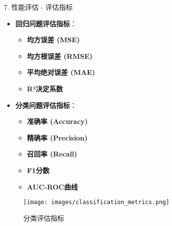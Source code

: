 \documentclass[
  ignorenonframetext,
  aspectratio=169,
  chinese-hans,
]{beamer}
\providecommand{\tightlist}{%
  \setlength{\itemsep}{0pt}\setlength{\parskip}{0pt}}\usepackage{longtable,booktabs,array}
\begin{document}
\begin{frame}{7. 性能评估 - 评估指标}
\label{ux6027ux80fdux8bc4ux4f30---ux8bc4ux4f30ux6307ux6807}
\begin{itemize}
\tightlist
\item
  \textbf{回归问题评估指标}：

  \begin{itemize}
  \tightlist
  \item
    \textbf{均方误差 (MSE)}
  \item
    \textbf{均方根误差 (RMSE)}
  \item
    \textbf{平均绝对误差 (MAE)}
  \item
    \textbf{R²决定系数}
  \end{itemize}
\item
  \textbf{分类问题评估指标}：

  \begin{itemize}
  \tightlist
  \item
    \textbf{准确率 (Accuracy)}
  \item
    \textbf{精确率 (Precision)}
  \item
    \textbf{召回率 (Recall)}
  \item
    \textbf{F1分数}
  \item
    \textbf{AUC-ROC曲线}
  \end{itemize}
\end{itemize}

\begin{figure}[H]

{\centering \texttt{[image: images/classification\_metrics.png]}

}

\caption{分类评估指标}

\end{figure}%
\end{frame}
\end{document}
